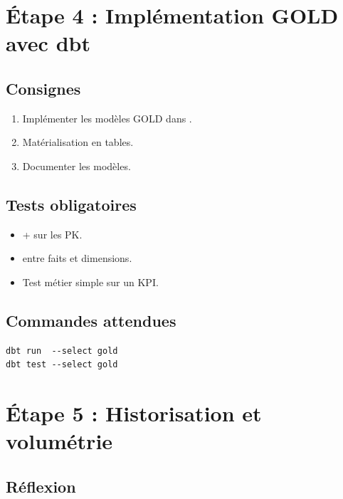 \documentclass[11pt,a4paper]{article}
\begin{document}

\section{Étape 4 : Implémentation GOLD avec dbt}

\subsection*{Consignes}

\begin{enumerate}
  \item Implémenter les modèles GOLD dans .
  \item Matérialisation en tables.
  \item Documenter les modèles.
\end{enumerate}

\subsection*{Tests obligatoires}

\begin{itemize}
  \item {} +  sur les PK.
  \item {} entre faits et dimensions.
  \item Test métier simple sur un KPI.
\end{itemize}

\subsection*{Commandes attendues}

\begin{lstlisting}
dbt run  --select gold
dbt test --select gold
\end{lstlisting}


\section{Étape 5 : Historisation et volumétrie}

\subsection*{Réflexion}
\end{document}
